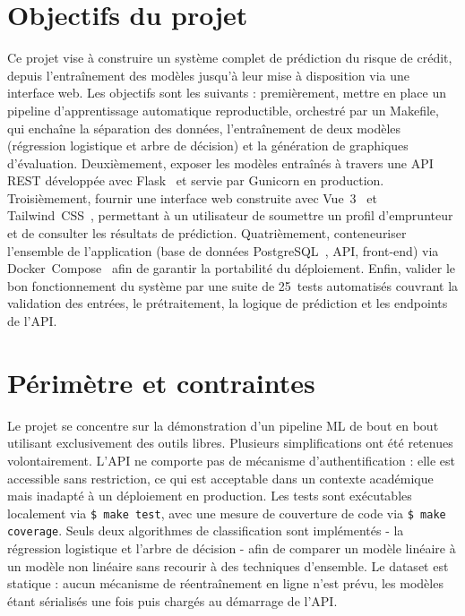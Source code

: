 \documentclass[12pt,a4paper,openany]{report}
\newcommand{\cmd}[1]{\texttt{\$ #1}}
\begin{document}
\section{Objectifs du projet}

Ce projet vise à construire un système complet de prédiction du risque de crédit, depuis l'entraînement des modèles jusqu'à leur mise à disposition via une interface web. Les objectifs sont les suivants : premièrement, mettre en place un pipeline d'apprentissage automatique reproductible, orchestré par un Makefile, qui enchaîne la séparation des données, l'entraînement de deux modèles (régression logistique et arbre de décision) et la génération de graphiques d'évaluation. Deuxièmement, exposer les modèles entraînés à travers une API REST développée avec Flask~\cite{flask} et servie par Gunicorn en production. Troisièmement, fournir une interface web construite avec Vue~3~\cite{vuejs} et Tailwind~CSS~\cite{tailwindcss}, permettant à un utilisateur de soumettre un profil d'emprunteur et de consulter les résultats de prédiction. Quatrièmement, conteneuriser l'ensemble de l'application (base de données PostgreSQL~\cite{postgresql}, API, front-end) via Docker~Compose~\cite{dockercompose} afin de garantir la portabilité du déploiement. Enfin, valider le bon fonctionnement du système par une suite de 25~tests automatisés couvrant la validation des entrées, le prétraitement, la logique de prédiction et les endpoints de l'API.

\section{Périmètre et contraintes}

Le projet se concentre sur la démonstration d'un pipeline ML de bout en bout utilisant exclusivement des outils libres. Plusieurs simplifications ont été retenues volontairement. L'API ne comporte pas de mécanisme d'authentification : elle est accessible sans restriction, ce qui est acceptable dans un contexte académique mais inadapté à un déploiement en production. Les tests sont exécutables localement via \cmd{make test}, avec une mesure de couverture de code via \cmd{make coverage}. Seuls deux algorithmes de classification sont implémentés - la régression logistique et l'arbre de décision - afin de comparer un modèle linéaire à un modèle non linéaire sans recourir à des techniques d'ensemble. Le dataset est statique : aucun mécanisme de réentraînement en ligne n'est prévu, les modèles étant sérialisés une fois puis chargés au démarrage de l'API.
\end{document}
